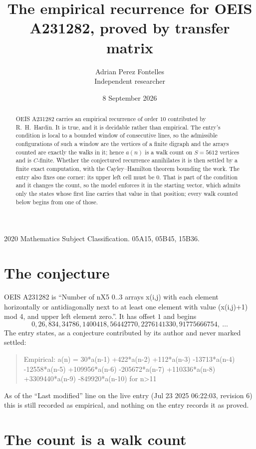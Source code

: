 \documentclass[11pt,a4paper]{article}
\title{The empirical recurrence for OEIS A231282, proved by transfer matrix}
\author{Adrian Perez Fontelles\\ \small Independent researcher}
\date{8 September 2026}
\theoremstyle{plain}
\theoremstyle{definition}
\begin{document}
\maketitle

\begin{abstract}
OEIS A231282 carries an empirical recurrence of order $10$ contributed by R.~H.~Hardin. It is
true, and it is decidable rather than empirical. The entry's condition is local to a bounded window of consecutive lines, so
the admissible configurations of such a window are the vertices of a finite digraph and the
arrays counted are exactly the walks in it; hence $a(n)$ is a walk count on $S=5612$ vertices
and is $C$-finite. Whether the conjectured recurrence annihilates it is then settled by a
finite exact computation, with the Cayley--Hamilton theorem bounding the work.
 The entry also fixes one corner: its upper left cell must be $0$. That is part of the condition and it changes the count, so the model enforces it in the starting vector, which admits only the states whose first line carries that value in that position; every walk counted below begins from one of those.\end{abstract}

\noindent\small 2020 Mathematics Subject Classification. 05A15, 05B45, 15B36.\normalsize

\section{The conjecture}

OEIS A231282 is ``Number of nX5 0..3 arrays x(i,j) with each element horizontally or antidiagonally next to at least one element with value (x(i,j)+1) mod 4, and upper left element zero.''. It has offset $1$ and begins
\[
0, 26, 834, 34786, 1400418, 56442770, 2276141330, 91775666754,\ \dots
\]
The entry states, as a conjecture contributed by its author and never marked settled:
\begin{quote}
Empirical: a(n) = 30*a(n-1) +422*a(n-2) +112*a(n-3) -13713*a(n-4) -12558*a(n-5) +109956*a(n-6) -205672*a(n-7) +110336*a(n-8) +3309440*a(n-9) -849920*a(n-10) for n>11
\end{quote}
As of the ``Last modified'' line on the live entry (Jul 23 2025 06:22:03, revision 6) this is still
recorded as empirical, and nothing on the entry records it as proved.

\section{The count is a walk count}
\end{document}
